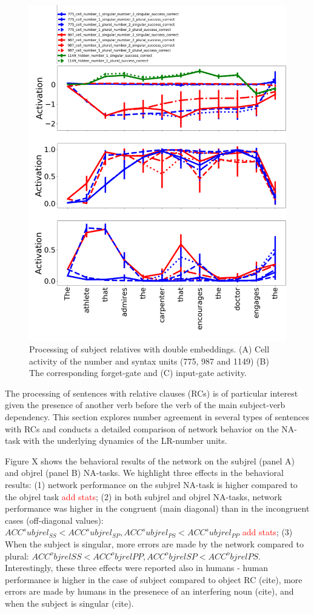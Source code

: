 \begin{figure}[b]
\centering
\includegraphics[width=\linewidth]{Figures/Figure9_doubleRC.png}
\caption{Processing of subject relatives with double embeddings. (A) Cell activity of the number and syntax units (775, 987 and 1149) (B) The corresponding forget-gate and (C) input-gate activity.}
\end{figure}

The processing of sentences with relative clauses (RCs) is of particular interest given the presence of another verb before the verb of the main subject-verb dependency. This section explores number agreement in several types of sentences with RCs and conducts a detailed comparison of network behavior on the NA-task with the underlying dynamics of the LR-number units.

Figure X shows the behavioral results of the network on the subjrel (panel A) and objrel (panel B) NA-tasks. We highlight three effects in the behavioral results: (1) network performance on the subjrel NA-task is higher compared to the objrel task \textcolor{red}{add stats}; (2) in both subjrel and objrel NA-tasks, network performance was higher in the congruent (main diagonal) than in the incongruent cases (off-diagonal values): $ACC^subjrel_{SS}<ACC^subjrel_{SP}, ACC^subjrel_{PS}<ACC^subjrel_{PP}$ \textcolor{red}{add stats}; (3) When the subject is singular, more errors are made by the network compared to plural: $ACC^objrel{SS}<ACC^objrel{PP}, ACC^objrel{SP}<ACC^objrel{PS}$. Interestingly, these three effects were reported also in humans - human performance is higher in the case of subject compared to object RC (cite), more errors are made by humans in the presenece of an interfering noun (cite), and when the subject is singular (cite). 

